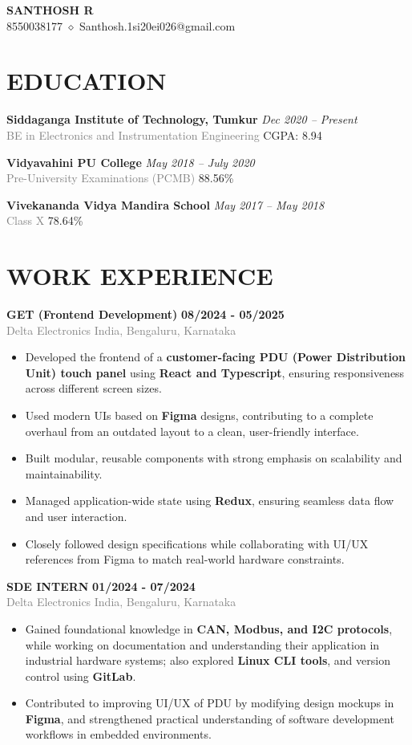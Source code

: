 \documentclass[a4paper,11pt]{article}
\newcommand{\entry}[4]{
    \noindent\textbf{\textcolor{primary}{#1}} \hfill \textit{#2} \\
    \textcolor{gray}{#3} \hfill #4 \\
}
\newcommand{\contactinfo}[3]{
    \begin{center}
        \textbf{\Large {#1}} \\
        \vspace{3pt}
        {#2} $\diamond$ {#3}
    \end{center}
}
\begin{document}
\contactinfo{SANTHOSH R}{8550038177}{Santhosh.1si20ei026@gmail.com}

\section{EDUCATION}
\entry{Siddaganga Institute of Technology, Tumkur}{Dec 2020 -- Present}{BE in Electronics and Instrumentation Engineering}{CGPA: 8.94}
\vspace{2pt}
\entry{Vidyavahini PU College}{May 2018 -- July 2020}{Pre-University Examinations (PCMB)}{88.56\%}
\vspace{2pt}
\entry{Vivekananda Vidya Mandira School}{May 2017 -- May 2018}{Class X}{78.64\%}

\section{WORK EXPERIENCE}
\noindent\textbf{\textcolor{primary}{GET (Frontend Development)}} \hfill \textbf{08/2024 - 05/2025} \\
\textcolor{gray}{Delta Electronics India, Bengaluru, Karnataka} 
\begin{itemize}
    \item Developed the frontend of a \textbf{customer-facing PDU (Power Distribution Unit) touch panel} using \textbf{React and Typescript}, ensuring responsiveness across different screen sizes.
    \item Used modern UIs based on \textbf{Figma} designs, contributing to a complete overhaul from an outdated layout to a clean, user-friendly interface.
    \item Built modular, reusable components with strong emphasis on scalability and maintainability.
    \item Managed application-wide state using \textbf{Redux}, ensuring seamless data flow and user interaction.
    \item Closely followed design specifications while collaborating with UI/UX references from Figma to match real-world hardware constraints.
\end{itemize}

\noindent\textbf{\textcolor{primary}{SDE INTERN}} \hfill \textbf{01/2024 - 07/2024} \\
\textcolor{gray}{Delta Electronics India, Bengaluru, Karnataka} \\
\begin{itemize}
    \item Gained foundational knowledge in \textbf{CAN, Modbus, and I2C protocols}, while working on documentation and understanding their application in industrial hardware systems; also explored \textbf{Linux CLI tools}, and version control using \textbf{GitLab}.
    \item Contributed to improving UI/UX of PDU by modifying design mockups in \textbf{Figma}, and strengthened practical understanding of software development workflows in embedded environments.
\end{itemize}
\end{document}
